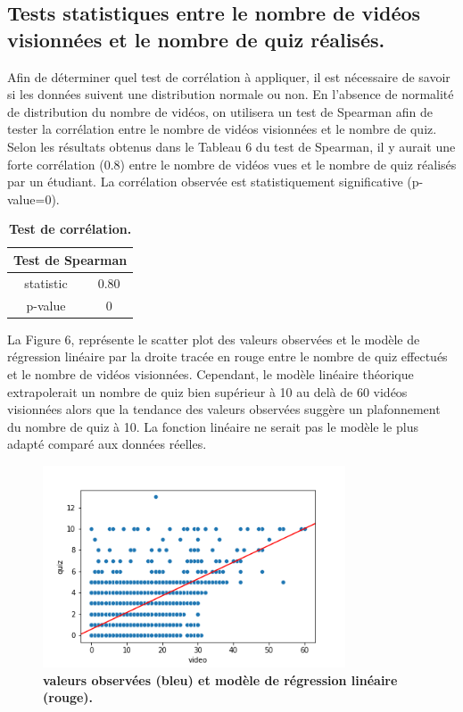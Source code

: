 \documentclass[12pt, a4paper, titlepage, table]{article}
\begin{document}
\subsection{Tests statistiques entre le nombre de vidéos visionnées et le nombre de quiz réalisés.}
Afin de déterminer quel test de corrélation à appliquer, il est nécessaire de savoir si les données suivent une distribution normale ou non. 
En l'absence de normalité de distribution du nombre de vidéos, on utilisera un test de Spearman afin de tester la corrélation entre le nombre de vidéos 
visionnées et le nombre de quiz. 
Selon les résultats obtenus dans le Tableau 6 du test de Spearman, il y aurait une forte corrélation (0.8) entre le nombre de vidéos vues et le nombre 
de quiz réalisés par un étudiant. 
La corrélation observée est statistiquement significative (p-value=0).
\begin{table}[H]
	\centering
	\fontsize{12}{20}\selectfont
	\begin{tabular}{|c|c|}
		\hline
		\multicolumn{2}{|c|}{\textbf{Test de Spearman}}\\ 
		\hline 
		statistic& 0.80\\
		p-value& 0\\
		\hline
	\end{tabular}
	\caption{\textbf{Test de corrélation.}}
\end{table}

La Figure 6, représente le scatter plot des valeurs observées et le modèle de régression linéaire par la droite tracée en rouge entre le nombre de quiz
effectués et le nombre de vidéos visionnées. Cependant, le modèle linéaire théorique extrapolerait un nombre de quiz bien supérieur à 10 au delà de 60 vidéos 
visionnées alors que la tendance des valeurs observées suggère un plafonnement du nombre de quiz à 10. 
La fonction linéaire ne serait pas le modèle le plus adapté comparé aux données réelles.

\begin{figure}[H]
	\centering
	\includegraphics[width=0.8\textwidth]{../../graph/scatter2_regression.png}
	\caption{\textbf{valeurs observées (bleu) et modèle de régression linéaire (rouge).}}
\end{figure}
\end{document}
